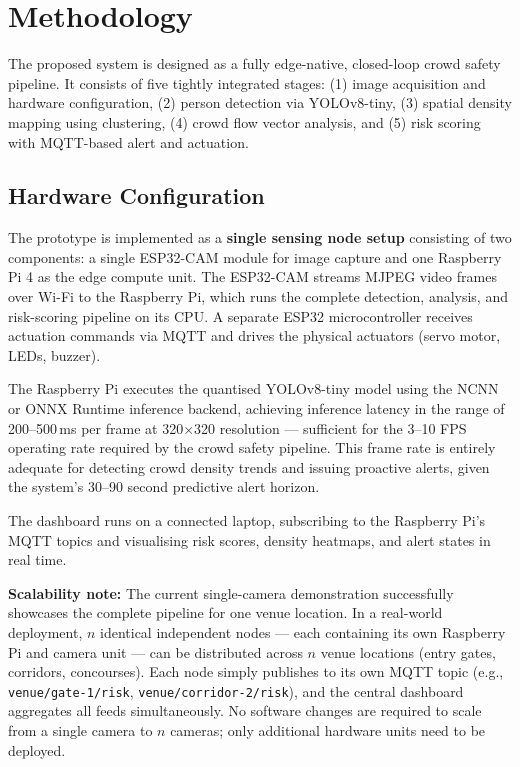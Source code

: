 \documentclass[12pt,a4paper]{article}
\begin{document}
\section{Methodology}

The proposed system is designed as a fully edge-native, closed-loop crowd safety pipeline. It consists of five tightly integrated stages: (1) image acquisition and hardware configuration, (2) person detection via YOLOv8-tiny, (3) spatial density mapping using clustering, (4) crowd flow vector analysis, and (5) risk scoring with MQTT-based alert and actuation. 

\subsection{Hardware Configuration}

The prototype is implemented as a \textbf{single sensing node setup} consisting of two components: a single ESP32-CAM module for image capture and one Raspberry Pi 4 as the edge compute unit. The ESP32-CAM streams MJPEG video frames over Wi-Fi to the Raspberry Pi, which runs the complete detection, analysis, and risk-scoring pipeline on its CPU. A separate ESP32 microcontroller receives actuation commands via MQTT and drives the physical actuators (servo motor, LEDs, buzzer).

The Raspberry Pi executes the quantised YOLOv8-tiny model using the NCNN or ONNX Runtime inference backend, achieving inference latency in the range of 200--500\,ms per frame at 320$\times$320 resolution — sufficient for the 3--10 FPS operating rate required by the crowd safety pipeline. This frame rate is entirely adequate for detecting crowd density trends and issuing proactive alerts, given the system's 30--90 second predictive alert horizon.

The dashboard runs on a connected laptop, subscribing to the Raspberry Pi's MQTT topics and visualising risk scores, density heatmaps, and alert states in real time.

\textbf{Scalability note:} The current single-camera demonstration successfully showcases the complete pipeline for one venue location. In a real-world deployment, $n$ identical independent nodes — each containing its own Raspberry Pi and camera unit — can be distributed across $n$ venue locations (entry gates, corridors, concourses). Each node simply publishes to its own MQTT topic (e.g., \texttt{venue/gate-1/risk}, \texttt{venue/corridor-2/risk}), and the central dashboard aggregates all feeds simultaneously. No software changes are required to scale from a single camera to $n$ cameras; only additional hardware units need to be deployed.
\end{document}
